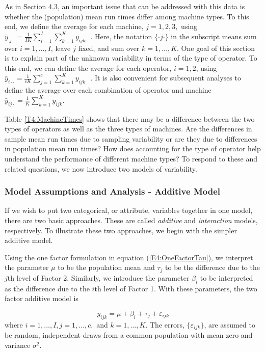 As in Section 4.3, an important issue that can be addressed with
this data is whether the (population) mean run times differ among
machine types. To this end, we define the average for each machine,
$j=1,2,3,$ using $ \bar{y}_{\cdot j\cdot
}=\frac{1}{IK}\sum_{i=1}^{I}\sum_{k=1}^{K}y_{ijk}\text{ }.$ Here,
the notation $\{\cdot j\cdot \}$ in the subscript means sum over $%
i=1,\ldots ,I$, leave $j$ fixed, and sum over $k=1,\ldots ,K$. One
goal of this section is to explain part of the unknown variability
in terms of the type of operator. To this end, we can define the
average for each operator, $i=1,2$, using $\bar{y}_{i\cdot \cdot
}=\frac{1}{cK}\sum_{j=1}^{c}\sum_{k=1}^{K}y_{ijk}\text{ }.$
 It is also convenient for subsequent analyses to define
the average over each combination of operator and machine
$\bar{y}_{ij\cdot }=\frac{1}{K}\sum_{k=1}^{K}y_{ijk}. $

Table \ref{T4:MachineTimes} shows that there may be a difference
between the two types of operators as well as the three types of
machines. Are the differences in sample mean run times due to
sampling variability or are they due to differences in population
mean run times? How does accounting for the type of operator help
understand the performance of different machine types? To respond to
these and related questions, we now introduce two models of
variability.

\linejed

\subsubsection*{Model Assumptions and Analysis - Additive Model}

If we wish to put two categorical, or attribute, variables together
in one model, there are two basic approaches. These are called
\textit{additive} and \textit{interaction} models, respectively. To
illustrate these two approaches, we begin with the simpler additive
model.

Using the one factor formulation in equation
(\ref{E4:OneFactorTau}), we interpret the parameter $\mu $ to be the
population mean and $\tau_{j}$ to be the difference due to the $j$th
level of Factor 2. Similarly, we introduce the parameter $\beta_i$
to be interpreted as the difference due to the $i$th level of Factor
1. With these parameters, the two factor additive model is

\begin{equation}  \label{E4:TwoFactorTau}
y_{ijk}=\mu +\beta_i+\tau_{j}+\varepsilon_{ijk}
\end{equation}%
where $i=1,\ldots ,I,j=1,\ldots ,c,$ and $k=1,\ldots ,K$. The
errors, $ \{\varepsilon_{ijk}\}$, are assumed to be random,
independent draws from a common population with mean zero and
variance $\sigma ^{2}$.

